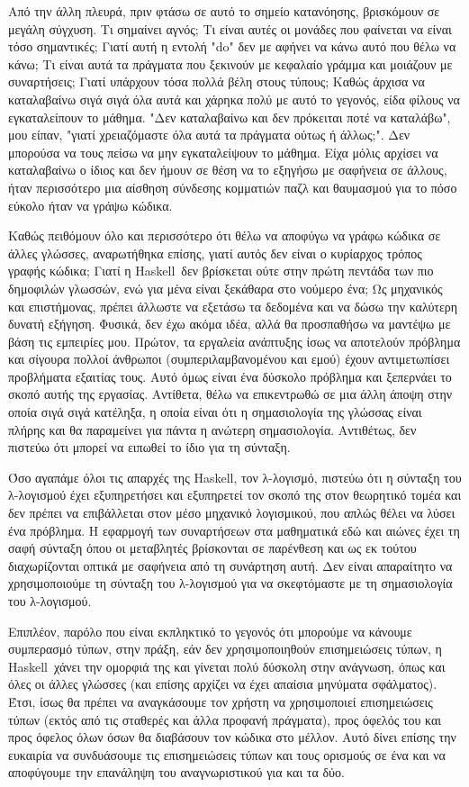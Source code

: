 \documentclass[diploma]{softlab-thesis}
\def\H{Haskell}
\begin{document}
Από την άλλη πλευρά, πριν φτάσω σε αυτό το σημείο κατανόησης,
βρισκόμουν σε μεγάλη σύγχυση. Τι σημαίνει αγνός;
Τι είναι αυτές οι μονάδες που φαίνεται να είναι τόσο σημαντικές;
Γιατί αυτή η εντολή "do" δεν με αφήνει να κάνω αυτό που θέλω να κάνω;
Τι είναι αυτά τα πράγματα που ξεκινούν με κεφαλαίο γράμμα και μοιάζουν με
συναρτήσεις; Γιατί υπάρχουν τόσα πολλά βέλη στους τύπους;
Καθώς άρχισα να καταλαβαίνω σιγά σιγά όλα αυτά και χάρηκα πολύ
με αυτό το γεγονός, είδα φίλους να εγκαταλείπουν το μάθημα.
"Δεν καταλαβαίνω και δεν πρόκειται ποτέ να καταλάβω", μου είπαν,
"γιατί χρειαζόμαστε όλα αυτά τα πράγματα ούτως ή άλλως;".
Δεν μπορούσα να τους πείσω να μην εγκαταλείψουν το μάθημα.
Είχα μόλις αρχίσει να καταλαβαίνω ο ίδιος και δεν ήμουν σε θέση να
το εξηγήσω με σαφήνεια σε άλλους,
ήταν περισσότερο μια αίσθηση σύνδεσης κομματιών παζλ και θαυμασμού
για το πόσο εύκολο ήταν να γράψω κώδικα.

Καθώς πειθόμουν όλο και περισσότερο ότι θέλω να αποφύγω να γράφω
κώδικα σε άλλες γλώσσες, αναρωτήθηκα επίσης, γιατί αυτός δεν είναι
ο κυρίαρχος τρόπος γραφής κώδικα; Γιατί η \H\ δεν βρίσκεται ούτε
στην πρώτη πεντάδα των πιο δημοφιλών γλωσσών, ενώ για μένα είναι
ξεκάθαρα στο νούμερο ένα;  Ως μηχανικός και επιστήμονας, πρέπει
άλλωστε να εξετάσω τα δεδομένα και να δώσω την καλύτερη δυνατή εξήγηση.
Φυσικά, δεν έχω ακόμα ιδέα, αλλά θα προσπαθήσω να μαντέψω με
βάση τις εμπειρίες μου. Πρώτον, τα εργαλεία ανάπτυξης ίσως να
αποτελούν πρόβλημα και σίγουρα πολλοί άνθρωποι (συμπεριλαμβανομένου
και εμού) έχουν αντιμετωπίσει προβλήματα εξαιτίας τους.
Αυτό όμως είναι ένα δύσκολο πρόβλημα και ξεπερνάει το σκοπό αυτής
της εργασίας. Αντίθετα, θέλω να επικεντρωθώ σε μια άλλη
άποψη στην οποία σιγά σιγά κατέληξα, η οποία είναι ότι η σημασιολογία της
γλώσσας είναι πλήρης και θα παραμείνει για πάντα η ανώτερη σημασιολογία.
Αντιθέτως, δεν πιστεύω ότι μπορεί να ειπωθεί το ίδιο για τη σύνταξη.

Όσο αγαπάμε όλοι τις απαρχές της \H, τον λ-λογισμό, πιστεύω ότι η
σύνταξη του λ-λογισμού έχει εξυπηρετήσει και εξυπηρετεί τον σκοπό της
στον θεωρητικό τομέα και δεν πρέπει να επιβάλλεται στον μέσο μηχανικό
λογισμικού, που απλώς θέλει να λύσει ένα πρόβλημα.
Η εφαρμογή των συναρτήσεων στα μαθηματικά εδώ και
αιώνες έχει τη σαφή σύνταξη όπου οι μεταβλητές βρίσκονται σε παρένθεση
και ως εκ τούτου διαχωρίζονται οπτικά με σαφήνεια από τη συνάρτηση αυτή.
Δεν είναι απαραίτητο να χρησιμοποιούμε τη σύνταξη του λ-λογισμού για
να σκεφτόμαστε με τη σημασιολογία του λ-λογισμού.

Επιπλέον, παρόλο που είναι εκπληκτικό το γεγονός ότι μπορούμε να
κάνουμε συμπερασμό τύπων, στην πράξη, εάν δεν χρησιμοποιηθούν
επισημειώσεις τύπων, η \H\ χάνει την ομορφιά της και γίνεται πολύ
δύσκολη στην ανάγνωση,
όπως και όλες οι άλλες γλώσσες (και επίσης αρχίζει να έχει απαίσια
μηνύματα σφάλματος).  Έτσι, ίσως θα πρέπει να αναγκάσουμε τον χρήστη να
χρησιμοποιεί επισημειώσεις τύπων (εκτός από τις σταθερές και άλλα προφανή
πράγματα), προς όφελός του και προς όφελος όλων όσων θα διαβάσουν τον
κώδικα στο μέλλον.  Αυτό δίνει επίσης την ευκαιρία να
συνδυάσουμε τις επισημειώσεις τύπων και τους ορισμούς σε ένα και να
αποφύγουμε την επανάληψη του αναγνωριστικού για και τα δύο.
\end{document}
